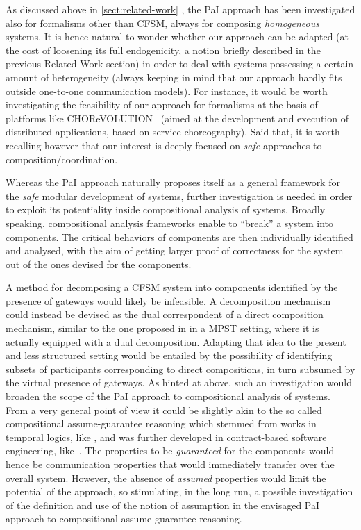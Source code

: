 As discussed above in \cref{sect:related-work} , the PaI approach has been investigated also for formalisms other than CFSM, always for composing {\em homogeneous} systems.
It is hence natural to wonder whether our approach can be adapted 
(at the cost of loosening its full endogenicity, a notion briefly described in the previous Related Work section) in order to deal with systems possessing
a certain amount of heterogeneity (always keeping in mind that our approach hardly fits outside
one-to-one communication models).
For instance, it would be worth investigating the feasibility of our approach for
formalisms at the basis of platforms like CHOReVOLUTION~\cite{CHOReVOLUTION} (aimed at the development and execution of distributed applications, based on service choreography).
Said that, it is worth recalling however that our interest is deeply focused on
{\em safe} approaches to composition/coordination. 






Whereas the PaI approach naturally proposes itself as a general framework for the {\em safe} modular 
development of systems, further investigation is needed in order to exploit its potentiality
inside compositional analysis of systems. 
Broadly speaking, compositional analysis frameworks enable to ``break'' a system into components.
The critical behaviors of components
are then individually identified and analysed, with the aim of getting larger proof of correctness for
the system out of the ones devised for the components.

A method for decomposing a CFSM system into components identified by the presence of gateways
 would likely be infeasible. A decomposition mechanism could instead be devised as the dual
correspondent of a direct composition mechanism, similar to the one proposed in \cite{BDLT21}
in a MPST setting, where it is actually equipped with a dual decomposition.
Adapting that idea to the present and less structured setting would be entailed by the possibility of 
identifying subsets of participants corresponding to direct compositions,
in turn subsumed by the virtual presence of gateways.
As hinted at above, such an investigation would broaden the scope of the PaI approach to  
compositional analysis of systems. From a very general point of view it could be slightly akin to 
the so called compositional assume-guarantee reasoning which stemmed from works in temporal logics, like \cite{Pnueli84}, and was %
further developed in contract-based software engineering, like~\cite{BDHLLNW12}.
The properties to be {\em guaranteed} for the components would hence be communication properties that would immediately transfer over the overall system.
However, the absence of {\em assumed} properties would limit the potential of the approach,
so stimulating, in the long run, a possible investigation of the definition and use  of the notion
of assumption in the envisaged PaI approach to compositional assume-guarantee reasoning.


